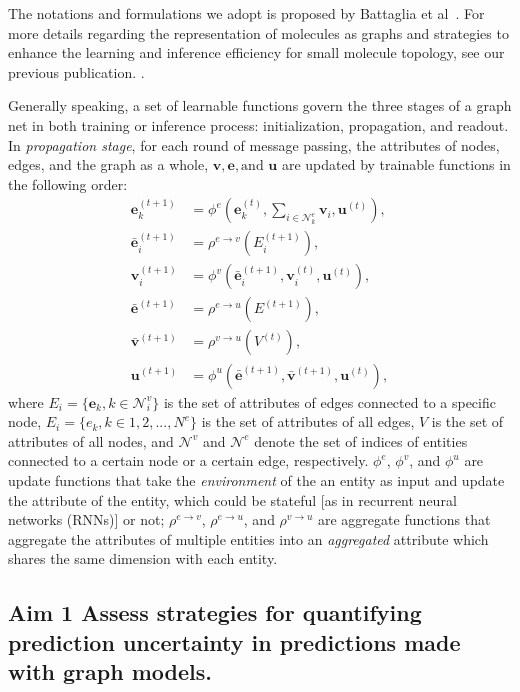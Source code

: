 \documentclass[11pt]{article}
\begin{document}
The notations and formulations we adopt is proposed by Battaglia et al~\cite{DBLP:journals/corr/abs-1806-01261}. 
For more details regarding the representation of molecules as graphs and strategies to enhance the learning and inference efficiency for small molecule topology, see our previous publication. \cite{2019arXiv190907903W}.

Generally speaking, a set of learnable functions govern the three stages of a graph net in both training or inference process:  initialization, propagation, and readout. In \textit{propagation stage}, for each round of message passing, the attributes of nodes, edges, and the graph as a whole, $\mathbf{v}, \mathbf{e}, \text{and } \mathbf{u}$ are updated by trainable functions in the following order:
    \begin{align}
    \mathbf{e}_k^{(t+1)} &= \phi^e(\mathbf{e}_k^{(t)}, \sum_{i \in \mathcal{N}^e_k}\mathbf{v}_i, \mathbf{u}^{(t)}), \\
    \bar{\mathbf{e}}_i^{(t+1)} &=\rho^{e\rightarrow v}(E_i^{(t+1)}), \\
    \mathbf{v}_i^{(t+1)} &= \phi^v(\bar{\mathbf{e}}_i^{(t+1)}, \mathbf{v}_i^{(t)}, \mathbf{u}^{(t)}), \\
    \bar{\mathbf{e}}^{(t+1)} &= \rho^{e \rightarrow u}(E^{(t+1)}), \\
    \bar{\mathbf{v}}^{(t+1)} &= \rho^{v \rightarrow u}(V^{(t)}), \\
    \mathbf{u}^{(t+1)} &= \phi^u(\bar{\mathbf{e}}^{(t+1)}, \bar{\mathbf{v}}^{(t+1)}, \mathbf{u}^{(t)}),
    \end{align}where $E_i=\{ \mathbf{e}_k, k\in \mathcal{N}_i^v\}$ is the set of attributes of edges connected to a specific node, $E_i = \{ e_k, k \in 1, 2, ..., N^e\}$ is the set of attributes of all edges, $V$ is the set of attributes of all nodes, and $\mathcal{N}^v$ and $\mathcal{N}^e$ denote the set of indices of entities connected to a certain node or a certain edge, respectively. $\phi^e$, $\phi^v$, and $\phi^u$ are update functions that take the \textit{environment} of the an entity as input and update the attribute of the entity, which could be stateful [as in recurrent neural networks (RNNs)] or not; $\rho^{e \rightarrow v}$, $\rho^{e \rightarrow u}$, and $\rho^{v \rightarrow u}$ are aggregate functions that aggregate the attributes of multiple entities into an \textit{aggregated} attribute which shares the same dimension with each entity. 

\subsection*{ \textbf{Aim 1} Assess strategies for quantifying prediction uncertainty in predictions made with graph models.}
\end{document}
